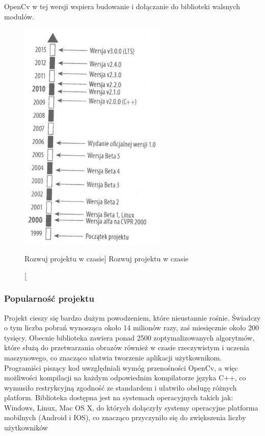 \documentclass[a4paper,12pt]{article}
\begin{document}
OpenCv w tej wersji wspiera budowanie i dołączanie do biblioteki walsnych modulów.

\newpage
\begin{figure}[!ht]   %
	\begin{center}
		\includegraphics[width=7cm] {osCzasu.png} 
	\end{center}
	\caption
	[Rozwuj projektu w czasie]  %
	{Rozwuj projektu w czasie}  %
\end{figure}

 
\subsubsection{Popularność projektu}  
Projekt cieszy się bardzo dużym powodzeniem, które nieustannie rośnie. Świadczy o tym liczba pobrań 
wynosząca około 14 milionów razy, zaś miesięcznie około 200 tysięcy.
Obecnie biblioteka zawiera ponad 2500 zoptymalizowanych algorytmów, które służą do przetwarzania obrazów
również w czasie rzeczywistym i uczenia maszynowego, co znacząco ułatwia tworzenie aplikacji użytkownikom. 
Programiści piszący kod uwzględniali wymóg przenośności OpenCv, a więc możliwości kompilacji na każdym odpowiednim kompilatorze języka C++, co wymusiło restrykcyjną zgodność ze standardem i ułatwiło obsługę różnych platform.
Biblioteka dostępna jest na systemach operacyjnych takich jak: Windows, Linux, Mac OS X, do których dołączyły systemy operacyjne platforma mobilnych (Android i IOS), co znacząco przyczyniło się do zwiększenia liczby użytkowników\\
\end{document}
